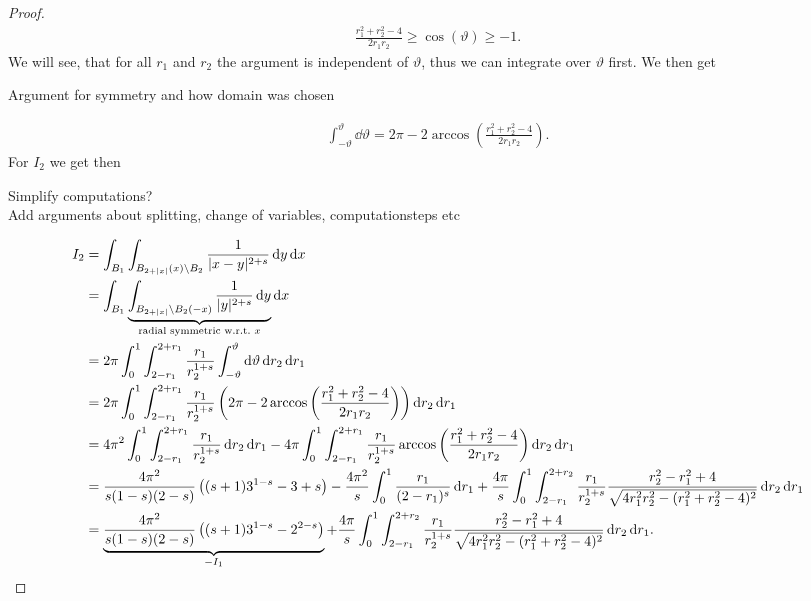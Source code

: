 \begin{proof}
	\begin{gather*}
		\frac{r_1^2 + r_2^2 - 4}{2r_1 r_2} \geq \cos(\vartheta) \geq - 1.
	\end{gather*}
	We will see, that for all \( r_1 \) and \( r_2 \) the argument is independent of \(
	\vartheta \), thus we can integrate over \( \vartheta \) first. We then get
	\begin{TODO}
		Argument for symmetry and how domain was chosen
	\end{TODO}
	\begin{gather*}
		\int_{- \vartheta}^\vartheta \dd{\vartheta} = 2\pi - 2 \arccos\left(\frac{r_1^2 + r_2^2 - 4}{2r_1 r_2}\right).
	\end{gather*}
	For \( I_2 \) we get then
	\begin{TODO}
		Simplify computations?\\
		Add arguments about splitting, change of variables, computationsteps etc
	\end{TODO}
	\begin{align*}
		I_2
		 & = \int_{B_1} \int_{B_{2 + \lvert x\rvert} (x) \setminus B_2} \frac{1}{\lvert x - y \rvert^{2 + s}} \dd{y} \dd{x} \\
		 & = \int_{B_1} \underbrace{\int_{B_{2 + \lvert x\rvert} \setminus B_2(- x)} \frac{1}{\lvert y \rvert^{2 + s}} \dd{y}}_{\text{radial symmetric w.r.t.\ \( x \)}} \dd{x} \\
		 & = 2 \pi \int_0^1 \int_{2 - r_1}^{2 + r_1} \frac{r_1}{r_2^{1 + s}} \int_{- \vartheta}^\vartheta \dd{\vartheta} \dd{r_2} \dd{r_1} \\
		 & = 2 \pi \int_0^1 \int_{2 - r_1}^{2 + r_1} \frac{r_1}{r_2^{1 + s}} \left(2\pi - 2 \arccos\left(\frac{r_1^2 + r_2^2 - 4}{2r_1 r_2}\right) \right) \dd{r_2} \dd{r_1} \\
		 & = 4 \pi^2 \int_0^1 \int_{2 - r_1}^{2 + r_1} \frac{r_1}{r_2^{1 + s}} \dd{r_2} \dd{r_1} - 4 \pi \int_0^1 \int_{2 - r_1}^{2 + r_1} \frac{r_1}{r_2^{1 + s}} \arccos\left(\frac{r_1^2 + r_2^2 - 4}{2r_1 r_2}\right) \dd{r_2} \dd{r_1} \\
		 & = \frac{4\pi^2}{s(1 - s)(2 - s)} \left((s + 1) 3^{1 - s} - 3 + s \right) - \frac{4\pi^2}{s} \int_0^1 \frac{r_1}{(2 - r_1)^s} \dd{r_1} + \frac{4\pi}{s} \int_0^1 \int_{2 - r_1}^{2 + r_2} \frac{r_1}{r_2^{1 + s}} \frac{r_2^2 - r_1^2 + 4}{\sqrt{4r_1^2 r_2^2 - (r_1^2 + r_2^2 - 4)^2}} \dd{r_2} \dd{r_1} \\
		 & = \underbrace{\frac{4\pi^2}{s(1 - s)(2 - s)} \left((s + 1) 3^{1 - s} - 2^{2 - s} \right)}_{- I_1} + \frac{4\pi}{s} \int_0^1 \int_{2 - r_1}^{2 + r_2} \frac{r_1}{r_2^{1 + s}} \frac{r_2^2 - r_1^2 + 4}{\sqrt{4r_1^2 r_2^2 - (r_1^2 + r_2^2 - 4)^2}} \dd{r_2} \dd{r_1}.

\end{align*}
\end{proof}
